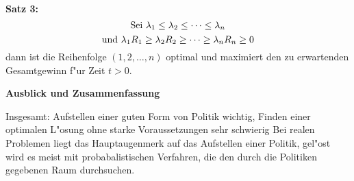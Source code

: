 \documentclass[a4paper]{report}
\begin{document}
\textbf{Satz 3:}
\begin{displaymath}\textnormal{Sei }\lambda_{1} \le \lambda_{2} \le \cdots \le \lambda_{n}\end{displaymath} 
\begin{displaymath}\textnormal{und }\lambda_{1}R_{1} \ge \lambda_{2}R_{2} \ge \cdots \ge \lambda_{n}R_{n} \ge 0\end{displaymath}
dann ist die Reihenfolge \((1, 2, \ldots, n)\) optimal und maximiert den zu erwartenden Gesamtgewinn f"ur Zeit \(t>0\).


\textbf{Ausblick und Zusammenfassung}

Insgesamt: Aufstellen einer guten Form von Politik wichtig, Finden einer optimalen L"osung ohne starke Voraussetzungen sehr schwierig
Bei realen Problemen liegt das Hauptaugenmerk auf das Aufstellen einer Politik, gel"ost wird es meist mit probabalistischen Verfahren, die den durch die Politiken gegebenen Raum durchsuchen.
\end{document}
